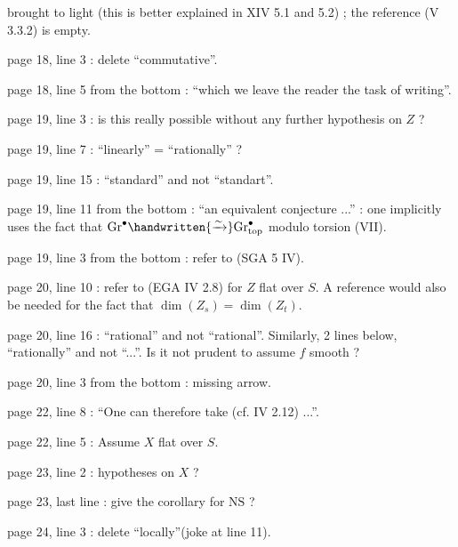  brought to light (this is better explained in XIV 5.1 and 5.2) ; the reference (V 3.3.2) is empty.

page 18, line 3 : delete ``commutative''.

page 18, line 5 from the bottom : ``which we leave the reader the task of writing''.

page 19, line 3 : is this really possible without any further hypothesis on $Z$ ?

page 19, line 7 : ``linearly'' = ``rationally'' ?

page 19, line 15 : ``standard'' and not ``standart''.

page 19, line 11 from the bottom : ``an equivalent conjecture ...'' : one implicitly uses the fact that $\mathrm{Gr}^{\bullet}\handwritten{\xrightarrow{\sim}}\mathrm{Gr}^{\bullet}_{\mathrm{top}}$ modulo torsion (VII\hspace{2em}).

page 19, line 3 from the bottom : refer to (SGA 5 IV\hspace{2em}).

page 20, line 10 : refer to (EGA IV 2.8) for $Z$ flat over $S$. A reference would also be needed for the fact that $\dim(Z_s) = \dim(Z_t)$.

page 20, line 16 : ``rational'' and not ``rational''. Similarly, 2 lines below, ``rationally'' and not ``...''. Is it not prudent to assume $f$ smooth ?

page 20, line 3 from the bottom : missing arrow.

page 22, line 8 : ``One can therefore take (cf. IV 2.12) ...''.

page 22, line 5 : Assume $X$ flat over $S$.

page 23, line 2 : hypotheses on $X$ ?

page 23, last line : give the corollary for $\mathrm{NS}$ ?

\noindent{}page 24, line 3 : delete ``locally''(joke at line 11).

